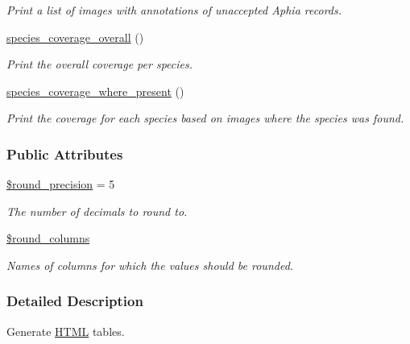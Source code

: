 \begin{DoxyCompactItemize}
\begin{DoxyCompactList}\small\item\em Print a list of images with annotations of unaccepted Aphia records. \end{DoxyCompactList}\item 
\hyperlink{classDataTable_a6cc56465dab08d3ee3056e8194763c59}{species\-\_\-coverage\-\_\-overall} ()
\begin{DoxyCompactList}\small\item\em Print the overall coverage per species. \end{DoxyCompactList}\item 
\hypertarget{classDataTable_a3b2e8e53c42632b99bedf359ea3d5632}{\hyperlink{classDataTable_a3b2e8e53c42632b99bedf359ea3d5632}{species\-\_\-coverage\-\_\-where\-\_\-present} ()}\label{classDataTable_a3b2e8e53c42632b99bedf359ea3d5632}

\begin{DoxyCompactList}\small\item\em Print the coverage for each species based on images where the species was found. \end{DoxyCompactList}\end{DoxyCompactItemize}
\subsubsection*{Public Attributes}
\begin{DoxyCompactItemize}
\item 
\hypertarget{classDataTable_af4fe165de0ec60acfa2f3d5846353e39}{\hyperlink{classDataTable_af4fe165de0ec60acfa2f3d5846353e39}{\$round\-\_\-precision} = 5}\label{classDataTable_af4fe165de0ec60acfa2f3d5846353e39}

\begin{DoxyCompactList}\small\item\em The number of decimals to round to. \end{DoxyCompactList}\item 
\hyperlink{classDataTable_a70af4121fabf49b5d01b9e77c059a6cc}{\$round\-\_\-columns}
\begin{DoxyCompactList}\small\item\em Names of columns for which the values should be rounded. \end{DoxyCompactList}\end{DoxyCompactItemize}


\subsubsection{Detailed Description}
Generate \hyperlink{classHTML}{H\-T\-M\-L} tables. 

